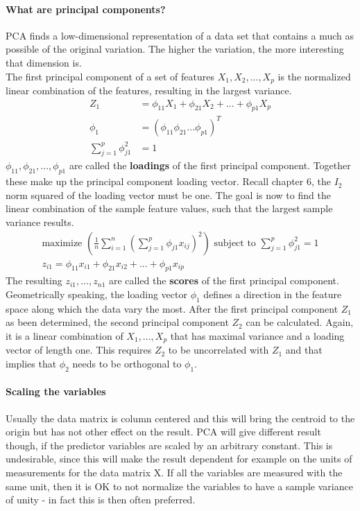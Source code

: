\documentclass[../document.tex]{subfiles}
\begin{document}
	\paragraph{What are principal components?}
	PCA finds a low-dimensional representation of a data set that contains a much as possible of the original variation. The higher the variation, the more interesting that dimension is.\\
	The first principal component of a set of features \(X_{1},X_{2},...,X_{p}\) is the normalized linear combination of the features, resulting in the largest variance.
	\begin{equation}
	\begin{split}
		Z_{1}&=\phi_{11}X_{1}+\phi_{21}X_{2}+...+\phi_{p1}X_{p}\\
		\phi_{1} &= (\phi_{11} \phi_{21} ... \phi_{p1})^T\\
		\sum_{j=1}^{p}\phi_{j1}^2&=1
	\end{split}
	\end{equation}
	\(\phi_{11}, \phi_{21},...,\phi_{p1}\) are called the \textbf{loadings} of the first principal component. Together these make up the principal component loading vector. Recall chapter 6, the \(I_{2}\) norm squared of the loading vector must be one. The goal is now to find the linear combination of the sample feature values, such that the largest sample variance results.
	\begin{equation}
	\begin{split}
		\text{maximize }(\frac{1}{n}\sum_{i=1}^{n}(\sum_{j=1}^{p}\phi_{j1}x_{ij})^2)\text{ subject to }\sum_{j=1}^{p}\phi_{j1}^2=1\\
		z_{i1}=\phi_{11}x_{i1}+\phi_{21}x_{i2}+...+\phi_{p1}x_{ip}
	\end{split}
	\end{equation}
	The resulting \(z_{i1},...,z_{n1}\) are called the \textbf{scores} of the first principal component. Geometrically speaking, the loading vector \(\phi_{1}\) defines a direction in the feature space along which the data vary the most. After the first principal component \(Z_{1}\) as been determined, the second principal component \(Z_{2}\) can be calculated. Again, it is a linear combination of \(X_{1},...,X_{p}\) that has maximal variance and a loading vector of length one. This requires \(Z_{2}\) to be uncorrelated with \(Z_{1}\) and that implies that \(\phi_{2}\) needs to be orthogonal to \(\phi_{1}\).
	\paragraph{Scaling the variables}
	Usually the data matrix is column centered and this will bring the centroid to the origin but has not other effect on the result. PCA will give different result though, if the predictor variables are scaled by an arbitrary constant. This is undesirable, since this will make the result dependent for example on the units of measurements for the data matrix X. If all the variables are measured with the same unit, then it is OK to not normalize the variables to have a sample variance of unity - in fact this is then often preferred.
\end{document}
